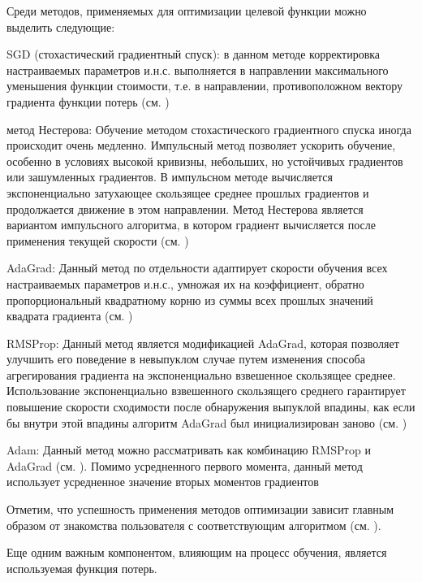 Среди методов, применяемых для оптимизации целевой функции можно выделить следующие:

\begin{textitemize}
	\item SGD (стохастический градиентный спуск): в данном методе корректировка настраиваемых параметров и.н.с. выполняется в направлении максимального уменьшения функции стоимости, т.е. в направлении, противоположном вектору градиента функции потерь (см. )
	\item метод Нестерова: Обучение методом стохастического градиентного спуска иногда происходит очень медленно. Импульсный метод позволяет ускорить обучение, особенно в условиях высокой кривизны, небольших, но устойчивых градиентов или зашумленных градиентов. В импульсном методе вычисляется экспоненциально затухающее скользящее среднее прошлых градиентов и продолжается движение в этом направлении. Метод Нестерова является вариантом импульсного алгоритма, в котором градиент вычисляется после применения текущей скорости (см. )
	\item AdaGrad: Данный метод по отдельности адаптирует скорости обучения всех настраиваемых параметров и.н.с., умножая их на коэффициент, обратно пропорциональный квадратному корню из суммы всех прошлых значений квадрата градиента (см. )
	\item RMSProp: Данный метод является модификацией AdaGrad, которая позволяет улучшить его поведение в невыпуклом случае путем изменения способа агрегирования градиента на экспоненциально взвешенное скользящее среднее. Использование экспоненциально взвешенного скользящего среднего гарантирует повышение скорости сходимости после обнаружения выпуклой впадины, как если бы внутри этой впадины алгоритм AdaGrad был инициализирован заново (см. )
	\item Adam: Данный метод можно рассматривать как комбинацию RMSProp и AdaGrad (см. ). Помимо усредненного первого момента, данный метод использует усредненное значение вторых моментов градиентов
\end{textitemize}

Отметим, что успешность применения методов оптимизации зависит главным образом от знакомства пользователя с соответствующим алгоритмом (см. ).

Еще одним важным компонентом, влияющим на процесс обучения, является используемая функция потерь.

